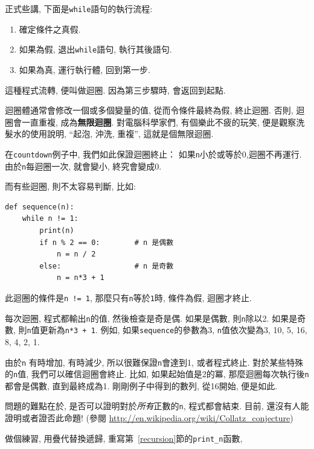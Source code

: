 \documentclass[10pt]{book}
\begin{document}
正式些講, 下面是{\tt while}語句的執行流程:

\begin{enumerate}

\item 確定條件之真假.

\item 如果為假, 退出{\tt while}語句, 執行其後語句. 

\item 如果為真, 運行執行體, 回到第一步. 

\end{enumerate}

這種程式流轉, 便叫做迴圈. 因為第三步驟時, 會返回到起點. 

迴圈體通常會修改一個或多個變量的值, 從而令條件最終為假, 終止迴圈. 
否則, 迴圈會一直重複, 成為{\bf 無限迴圈}. 
對電腦科學家們, 有個樂此不疲的玩笑, 
便是觀察洗髮水的使用說明, 
``起泡, 沖洗, 重複'',  這就是個無限迴圈. 

在{\tt countdown}例子中, 我們如此保證迴圈終止：
如果{\tt n}小於或等於0,迴圈不再運行. 
由於{\tt n}每迴圈一次, 就會變小, 終究會變成0.

而有些迴圈, 則不太容易判斷, 比如:

\begin{verbatim}
def sequence(n):
    while n != 1:
        print(n)
        if n % 2 == 0:        # n 是偶數
            n = n / 2
        else:                 # n 是奇數
            n = n*3 + 1
\end{verbatim}
%
此迴圈的條件是{\tt n != 1},  那麼只有{\tt n}等於{\tt 1}時, 條件為假, 迴圈才終止. 

每次迴圈, 程式都輸出{\tt n}的值, 然後檢查是奇是偶. 
如果是偶數, 則{\tt n}除以2. 如果是奇數, 則{\tt n}值更新為{\tt n*3 + 1}. 
例如, 如果{\tt sequence}的參數為3, {\tt n}值依次變為3, 10, 5, 16, 8, 4, 2, 1.


由於{\tt n} 有時增加, 有時減少, 所以很難保證{\tt n}會達到1, 或者程式終止. 
對於某些特殊的{\tt n}值, 我們可以確信迴圈會終止. 
比如, 如果起始值是2的冪, 那麼迴圈每次執行後{\tt n}都會是偶數, 直到最終成為1.
剛剛例子中得到的數列, 從16開始, 便是如此. 

問題的難點在於, 是否可以證明對於{\em 所有}正數的{\tt n}, 程式都會結束. 
目前, 還沒有人能證明或者證否此命題! 
(參閱 \url{http://en.wikipedia.org/wiki/Collatz_conjecture})

做個練習, 用疊代替換遞歸, 重寫第~\ref{recursion}節的\verb"print_n"函數, 
\end{document}
